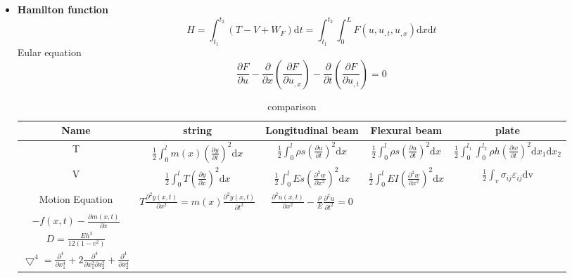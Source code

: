 \documentclass{article}
\begin{document}
\begin{multicols*}{2}
\begin{itemize}
  \item\textbf{Hamilton function}
\begin{equation*}
  H=\int_{t_{1}}^{t_{2}}(T-V+W_{F})\text{d}t
  =\int_{t_{1}}^{t_{2}}\int_{0}^{L}F(u,u_{,t},u_{,x})\text{d}x\text{d}t
\end{equation*}
Eular equation
\begin{equation*}
  \frac{\partial F}{\partial u}-\frac{\partial}{\partial x}(\frac{\partial F}{\partial u_{,x}})-\frac{\partial}{\partial t}(\frac{\partial F}{\partial u_{,t}})=0
\end{equation*}
  \begin{table*}
    \centering
    \caption{comparison}
    \begin{tabular}{|c|c|c|c|c|}
      \hline
      Name&string&Longitudinal beam& Flexural beam&plate\\
      \hline
      T&$\frac{1}{2}\int_{0}^{l}m(x)(\frac{\partial y}{\partial t})^{2}\text{d}x$
      &$\frac{1}{2}\int_{0}^{l}\rho s(\frac{\partial u}{\partial t})^{2}\text{d}x$
      &$\frac{1}{2}\int_{0}^{l}\rho s(\frac{\partial u}{\partial t})^{2}\text{d}x$
      &$\frac{1}{2}\int_{0}^{l_{1}}\int_{0}^{l_{2}}\rho h(\frac{\partial w}{\partial t})^{2}\text{d}x_{1}\text{d}x_{2}$\\ 
      \hline
      V&$\frac{1}{2}\int_{0}^{l}T(\frac{\partial y}{\partial x})^{2}\text{d}x$
      &$\frac{1}{2}\int_{0}^{l}Es(\frac{\partial^{2} w}{\partial x^{2}})^{2}\text{d}x$
      &$\frac{1}{2}\int_{0}^{l}EI(\frac{\partial^{2} w}{\partial x^{2}})^{2}\text{d}x$
      &$\frac{1}{2}\int_{v}\sigma_{ij}\varepsilon_{ij} \text{d}$v\\
      \hline
      Motion Equation&$T\frac{\partial ^{2}y(x,t)}{\partial x^{2}}=m(x)\frac{\partial^{2}y(x,t)}{\partial t^{2}}$
      &$\frac{\partial^{2}u(x,t)}{\partial x^{2}}-\frac{\rho}{E}\frac{\partial^{2}u}{\partial t^{2}}=0$
      &\makecell[c]{$\frac{\partial ^{2}}{\partial x^{2}}(EI\frac{\partial^{2}w}{\partial x^{2}})+\rho s \frac{\partial^{2}w}{\partial t^{2}}=$ \\ $-f(x,t)-\frac{\partial m(x,t)}{\partial x}$}
      &\makecell[c]{$D \bigtriangledown ^{4}w+\rho h \frac{\partial ^{2}}{\partial t^{2}}=f$\\
      $D=\frac{Eh^{3}}{12(1-v^{2})}$\\$\bigtriangledown^{4}=\frac{\partial ^{4}}{\partial x_{1}^{4}}+2\frac{\partial ^{4}}{\partial x_{1}^{2}\partial x_{2}^{2}}+\frac{\partial ^{4}}{\partial x_{2}^{4}}$}\\
      \hline
    \end{tabular}
  \end{table*}
 

\end{itemize}
\end{multicols*}
\end{document}
